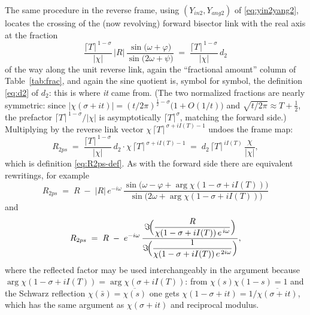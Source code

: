 \documentclass[11pt]{article}
\theoremstyle{definition}
\begin{document}
The same procedure in the reverse frame, using
$(Y_{in2},Y_{ang2})$ of \eqref{eq:yin2yang2}, locates the crossing of the
(now revolving) forward bisector link with the real axis at the fraction
\begin{equation}\label{eq:frac2}
\frac{\lceil T\rceil^{\,1-\sigma}}{|\chi|}\,
|R|\,\frac{\sin\!\bigl(\omega+\varphi\bigr)}{\sin\!\bigl(2\omega+\psi\bigr)}
\;=\;
\frac{\lceil T\rceil^{\,1-\sigma}}{|\chi|}\, d_2
\end{equation}
of the way along the unit reverse link, again the ``fractional amount''
column of Table~\ref{tab:frac}, and again the sine quotient is, symbol for
symbol, the definition \eqref{eq:d2} of $d_2$: this is where \emph{it} came
from. (The two normalized fractions are nearly symmetric: since
$|\chi(\sigma+it)|=(t/2\pi)^{\frac12-\sigma}\bigl(1+O(1/t)\bigr)$ and
$\sqrt{t/2\pi}\approx T+\tfrac12$, the prefactor
$\lceil T\rceil^{\,1-\sigma}/|\chi|$ is asymptotically
$\lceil T\rceil^{\sigma}$, matching the forward side.) Multiplying by the
reverse link vector $\chi\,\lceil T\rceil^{\,\sigma+iI(T)-1}$ undoes the
frame map:
\begin{equation}\label{eq:R2-derived}
R_{2ps}
\;=\;
\frac{\lceil T\rceil^{\,1-\sigma}}{|\chi|}\,d_2
\cdot \chi\,\lceil T\rceil^{\,\sigma+iI(T)-1}
\;=\;
d_2\,\lceil T\rceil^{\,iI(T)}\,\frac{\chi}{|\chi|},
\end{equation}
which is definition \eqref{eq:R2ps-def}. As with the forward side there are
equivalent rewritings, for example
\begin{equation}\label{eq:R2-other-a}
R_{2ps}
\;=\;
R \;-\; |R|\,e^{-i\omega}\,
\frac{\sin\!\bigl(\omega-\varphi+\arg\chi(1-\sigma+iI(T))\bigr)}
     {\sin\!\bigl(2\omega+\arg\chi(1-\sigma+iI(T))\bigr)}
\end{equation}
and
\begin{equation}\label{eq:R2-other-b}
R_{2ps}
\;=\;
R \;-\; e^{-i\omega}\,
\frac{\Im\!\Bigl(\dfrac{R}{\chi(1-\sigma+iI(T))\,e^{\,i\omega}}\Bigr)}
     {\Im\!\Bigl(\dfrac{1}{\chi(1-\sigma+iI(T))\,e^{\,2i\omega}}\Bigr)},
\end{equation}
where the reflected factor may be used interchangeably in the argument because
$\arg\chi(1-\sigma+iI(T))=\arg\chi(\sigma+iI(T))$: from
$\chi(s)\chi(1-s)=1$ and the Schwarz reflection
$\chi(\bar s)=\overline{\chi(s)}$ one gets
$\chi(1-\sigma+it)=1/\overline{\chi(\sigma+it)}$, which has the same
argument as $\chi(\sigma+it)$ and reciprocal modulus.
\end{document}
